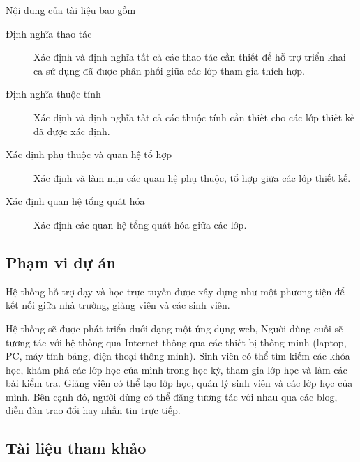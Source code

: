 \documentclass[./../main_file.tex]{subfiles}
\begin{document}
	Nội dung của tài liệu bao gồm
	\begin{description}
		\item[Định nghĩa thao tác] Xác định và định nghĩa tất cả các thao tác cần thiết để hỗ trợ triển khai ca sử dụng đã được phân phối giữa các lớp tham gia thích hợp.
		\item[Định nghĩa thuộc tính] Xác định và định nghĩa tất cả các thuộc tính cần thiết cho các lớp thiết kế đã được xác định.
		\item[Xác định phụ thuộc và quan hệ tổ hợp] Xác định và làm mịn các quan hệ phụ thuộc, tổ hợp giữa các lớp thiết kế.
		\item[Xác định quan hệ tổng quát hóa] Xác định các quan hệ tổng quát hóa giữa các lớp.
	\end{description}

\subsection{Phạm vi dự án}

Hệ thống hỗ trợ dạy và học trực tuyến được xây dựng như một phương tiện để kết nối giữa nhà trường, giảng viên và các sinh viên. 


Hệ thống sẽ được phát triển dưới dạng một ứng dụng web, Người dùng cuối sẽ tương tác với hệ thống qua Internet thông qua các thiết bị thông minh (laptop, PC, máy tính bảng, điện thoại thông minh). Sinh viên có thể tìm kiếm các khóa học, khám phá các lớp học của mình trong học kỳ, tham gia lớp học và làm các bài kiểm tra. Giảng viên có thể tạo lớp học, quản lý sinh viên và các lớp học của mình. Bên cạnh đó, người dùng có thể đăng tương tác với nhau qua các blog, diễn đàn trao đổi hay nhắn tin trực tiếp.


\subsection{Tài liệu tham khảo}
\nocite{*}
\printbibliography[heading=none]

\clearpage
\end{document}
